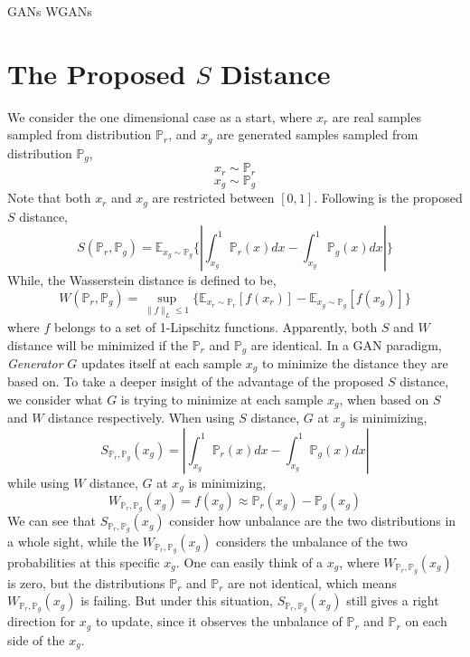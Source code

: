 \documentclass[letterpaper]{article} %
\begin{document}
GANs WGANs

\section{The Proposed $S$ Distance}
We consider the one dimensional case as a start, where $x_{r}$ are real samples sampled from distribution $\mathbb{P}_{r}$, and $x_{g}$ are generated samples sampled from distribution $\mathbb{P}_{g}$,
\begin{equation}\label{x-r}
   x_{r} \sim \mathbb{P}_{r}
\end{equation}
\begin{equation}\label{x-g}
  x_{g} \sim \mathbb{P}_{g}
\end{equation}
Note that both $x_{r}$ and $x_{g}$ are restricted between $[0,1]$. Following is the proposed $S$ distance,
\begin{equation}\label{s-distance}
  S(\mathbb{P}_r,\mathbb{P}_g)=\mathbb{E}_{x_g \sim \mathbb{P}_g} \{ | \int_{x_g}^{1} \mathbb{P}_r(x) d x - \int_{x_g}^{1} \mathbb{P}_g(x) d x | \}
\end{equation}
While, the Wasserstein distance is defined to be,
\begin{equation}\label{w-distance}
  W(\mathbb{P}_r,\mathbb{P}_g)=\sup_{\|f\|_L \leq 1} \{ \mathbb{E}_{x_r \sim \mathbb{P}_r} [f(x_r)] - \mathbb{E}_{x_g \sim \mathbb{P}_g} [f(x_g)] \}
\end{equation}
where $f$ belongs to a set of 1-Lipschitz functions.
Apparently, both $S$ and $W$ distance will be minimized if the $\mathbb{P}_r$ and $\mathbb{P}_g$ are identical.
In a GAN paradigm, \textit{Generator} $G$ updates itself at each sample $x_g$ to minimize the distance they are based on.
To take a deeper insight of the advantage of the proposed $S$ distance, we consider what $G$ is trying to minimize at each sample $x_g$, when based on $S$ and $W$ distance respectively.
When using $S$ distance, $G$ at $x_g$ is minimizing,
\begin{equation}\label{s-distance-at-xg}
  S_{\mathbb{P}_r,\mathbb{P}_g}(x_g)= | \int_{x_g}^{1} \mathbb{P}_r(x) d x - \int_{x_g}^{1} \mathbb{P}_g(x) d x |
\end{equation}
while using $W$ distance, $G$ at $x_g$ is minimizing,
\begin{equation}\label{w-distance-xg}
  W_{\mathbb{P}_r,\mathbb{P}_g}(x_g) = f(x_g) \approx \mathbb{P}_r(x_g) - \mathbb{P}_g(x_g)
\end{equation}
We can see that $S_{\mathbb{P}_r,\mathbb{P}_g}(x_g)$ consider how unbalance are the two distributions in a whole sight, while the $W_{\mathbb{P}_r,\mathbb{P}_g}(x_g)$ considers the unbalance of the two probabilities at this specific $x_g$. One can easily think of a $x_g$, where $W_{\mathbb{P}_r,\mathbb{P}_g}(x_g)$ is zero, but the distributions $\mathbb{P}_r$ and $\mathbb{P}_r$ are not identical, which means $W_{\mathbb{P}_r,\mathbb{P}_g}(x_g)$ is failing. But under this situation, $S_{\mathbb{P}_r,\mathbb{P}_g}(x_g)$ still gives a right direction for $x_g$ to update, since it observes the unbalance of $\mathbb{P}_r$ and $\mathbb{P}_r$ on each side of the $x_g$.
\end{document}
